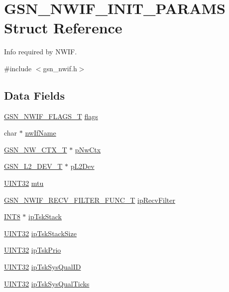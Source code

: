 \hypertarget{a00169}{
\section{GSN\_\-NWIF\_\-INIT\_\-PARAMS Struct Reference}
\label{a00169}
}


Info required by NWIF.  




{\ttfamily \#include $<$gsn\_\-nwif.h$>$}

\subsection*{Data Fields}
\begin{DoxyCompactItemize}
\item 
\hyperlink{a00670_ga2c209f2b9b6b2b6b0b2e1132acd45891}{GSN\_\-NWIF\_\-FLAGS\_\-T} \hyperlink{a00169_a4767d0f6570f98849cacbfa9a18ab612}{flags}
\item 
char $\ast$ \hyperlink{a00169_a34883f8c4ec77659710bb1b1e8f7ccae}{nwIfName}
\item 
\hyperlink{a00164}{GSN\_\-NW\_\-CTX\_\-T} $\ast$ \hyperlink{a00169_a4ab8e1b7273bd13fb04f9726ebf1d430}{pNwCtx}
\item 
\hyperlink{a00107}{GSN\_\-L2\_\-DEV\_\-T} $\ast$ \hyperlink{a00169_a26c032e68793c08c6f4c3509dee1e4f2}{pL2Dev}
\item 
\hyperlink{a00660_gae1e6edbbc26d6fbc71a90190d0266018}{UINT32} \hyperlink{a00169_a29e099f0875d30b6a75ee68c747dde11}{mtu}
\item 
\hyperlink{a00534_a2ab3fab7c51c5e11d061387dd44a2381}{GSN\_\-NWIF\_\-RECV\_\-FILTER\_\-FUNC\_\-T} \hyperlink{a00169_ab32f7d6fb4fbd0d87bb049ea5f1e07fa}{ipRecvFilter}
\item 
\hyperlink{a00660_ga307b8734c020247f6bac4fcde0dcfbb9}{INT8} $\ast$ \hyperlink{a00169_add3f3ec534fd1f44097468966f12316e}{ipTskStack}
\item 
\hyperlink{a00660_gae1e6edbbc26d6fbc71a90190d0266018}{UINT32} \hyperlink{a00169_a921646fe063cf448e229e452b74cc2ac}{ipTskStackSize}
\item 
\hyperlink{a00660_gae1e6edbbc26d6fbc71a90190d0266018}{UINT32} \hyperlink{a00169_a003165255dc4d674fa820b252cede443}{ipTskPrio}
\item 
\hyperlink{a00660_gae1e6edbbc26d6fbc71a90190d0266018}{UINT32} \hyperlink{a00169_ac3725e3448e4a6cab8f95add0cba081d}{ipTskSysQualID}
\item 
\hyperlink{a00660_gae1e6edbbc26d6fbc71a90190d0266018}{UINT32} \hyperlink{a00169_a48d8468fd7b93150628214b3bea70853}{ipTskSysQualTicks}

\end{DoxyCompactItemize}
